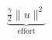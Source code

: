 \documentclass[preview]{standalone}
\begin{document}
\begin{align*}
\underbrace{\frac{\gamma}{2}\|u\|^2}_{\text{effort}}
\end{align*}
\end{document}
